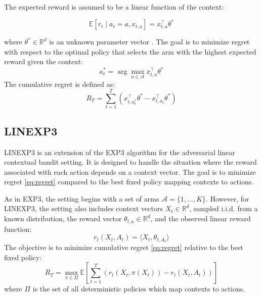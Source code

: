 The expected reward is assumed to be a linear function of the context:

\begin{equation}
\mathbb{E}[r_t \mid a_t = a, x_{t,a}] = x_{t,a}^\top \theta^*
\label{eq:contextual_reward}
\end{equation}

where \(\theta^* \in \mathbb{R}^\textit{d}\) is an unknown parameter vector \citep{neu2020linear}. The goal is to minimize regret with respect to the optimal policy that selects the arm with the highest expected reward given the context:
\begin{equation}
a_t^* = \arg\max_{a \in \mathcal{A}} x_{t,a}^\top \theta^*
\label{eq:optimal_policy}
\end{equation}
The cumulative regret is defined as:
\begin{equation}
R_T = \sum_{t=1}^T \left(x_{t,a_t^*}^\top \theta^* - x_{t,a_t}^\top \theta^*\right)
\end{equation}

\subsection{ LINEXP3}\label{subsec:linexp3}
LINEXP3 is an extension of the EXP3 algorithm for the adversarial linear contextual bandit setting. It is designed to handle the situation where the reward associated with each action depends on a context vector. The goal is to minimize regret  \ref{eq:regret} compared to the best fixed policy mapping contexts to actions. 

As in EXP3, the setting begins with a set of arms \(\mathcal{A} = \{1, \dots, K\}\). However, for LINEXP3, the setting also includes context vectors \(X_t \in \mathbb{R}^d\), sampled i.i.d. from a known distribution, the reward vector \(\theta_{t,a} \in \mathbb{R}^d\), and the observed linear reward function:
\begin{equation}
r_t(X_t, A_t) = \langle X_t, \theta_{t, A_t} \rangle
\label{eq:linexp3_reward}
\end{equation}
The objective is to minimize cumulative regret  \ref{eq:regret} relative to the best fixed policy:
\begin{equation}
R_T = \max_{\pi \in \Pi} \mathbb{E} \left[ \sum_{t=1}^{T} \left( r_t(X_t, \pi(X_t)) - r_t(X_t, A_t) \right) \right]
\label{eq:linexp3_regret}
\end{equation}
where \(\Pi\) is the set of all deterministic policies which map contexts to actions.


